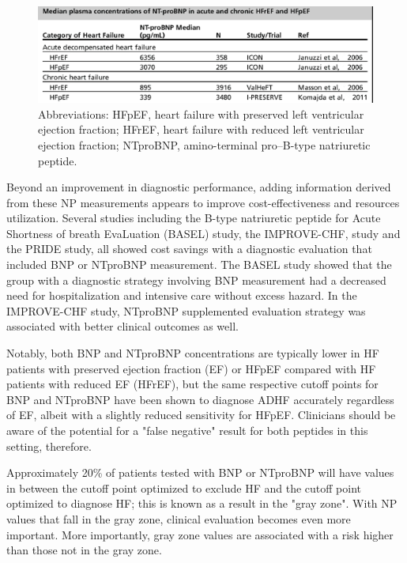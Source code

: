 \documentclass[14pt,a4paper,onecolumn]{extarticle}
\begin{document}
\begin{figure}   \includegraphics{../../images/NTBNP_HF.png}   \caption{Abbreviations: HFpEF, heart failure with preserved left ventricular ejection fraction; HFrEF, heart failure with reduced left ventricular ejection fraction; NTproBNP, amino-terminal pro–B-type natriuretic peptide. \citep{Richards2018}}   \label{NTBNP_HF} \end{figure}

Beyond an improvement in diagnostic performance, adding information derived from these NP measurements appears to improve cost-effectiveness and resources utilization. Several studies including the B-type natriuretic peptide for Acute Shortness of breath EvaLuation (BASEL) study, the IMPROVE-CHF, study and the PRIDE study, all showed cost savings with a diagnostic evaluation that included BNP or NTproBNP measurement. The BASEL study showed that the group with a diagnostic strategy involving BNP measurement had a decreased need for hospitalization and intensive care without excess hazard. In the IMPROVE-CHF study, NTproBNP supplemented evaluation strategy was associated with better clinical outcomes as well. \citep{Gaggin2014}

Notably, both BNP and NTproBNP concentrations are typically lower in HF patients with preserved ejection fraction (EF) or HFpEF compared with HF patients with reduced EF (HFrEF), but the same respective cutoff points for BNP and NTproBNP have been shown to diagnose ADHF accurately regardless of EF, albeit with a slightly reduced sensitivity for HFpEF.  Clinicians should be aware of the potential for a "false negative" result for both peptides in this setting, therefore. \citep{Maisel2003}

Approximately 20\% of patients tested with BNP or NTproBNP will have values in between the cutoff point optimized to exclude HF and the cutoff point optimized to diagnose HF; this is known as a result in the "gray zone". With NP values that fall in the gray zone, clinical evaluation becomes even more important. More importantly, gray zone values are associated with a risk higher than those not in the gray zone. \citep{van_Kimmenade2006}
\end{document}
